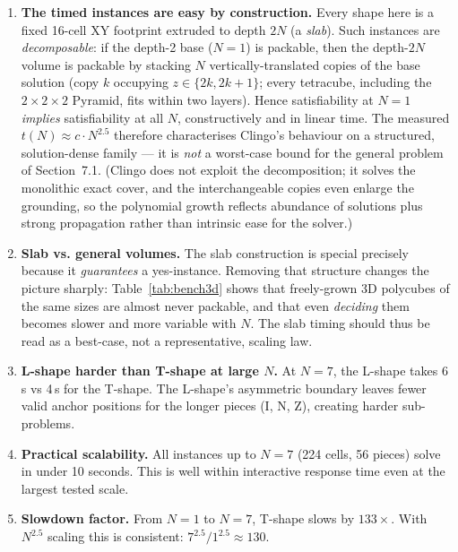 \documentclass[12pt,a4paper]{article}
\begin{document}
\begin{enumerate}[leftmargin=1.8em]
  \item \textbf{The timed instances are easy by construction.}  Every shape
        here is a fixed 16-cell XY footprint extruded to depth $2N$ (a
        \emph{slab}).  Such instances are \emph{decomposable}: if the depth-2
        base ($N=1$) is packable, then the depth-$2N$ volume is packable by
        stacking $N$ vertically-translated copies of the base solution
        (copy $k$ occupying $z \in \{2k, 2k+1\}$; every tetracube, including
        the $2\times2\times2$ Pyramid, fits within two layers).  Hence
        satisfiability at $N=1$ \emph{implies} satisfiability at all $N$,
        constructively and in linear time.  The measured
        $t(N) \approx c \cdot N^{2.5}$ therefore characterises Clingo's
        behaviour on a structured, solution-dense family --- it is \emph{not}
        a worst-case bound for the general problem of Section~7.1.  (Clingo
        does not exploit the decomposition; it solves the monolithic exact
        cover, and the interchangeable copies even enlarge the grounding, so
        the polynomial growth reflects abundance of solutions plus strong
        propagation rather than intrinsic ease for the solver.)

  \item \textbf{Slab vs. general volumes.}  The slab construction is special
        precisely because it \emph{guarantees} a yes-instance.  Removing that
        structure changes the picture sharply: Table~\ref{tab:bench3d} shows
        that freely-grown 3D polycubes of the same sizes are almost never
        packable, and that even \emph{deciding} them becomes slower and more
        variable with $N$.  The slab timing should thus be read as a
        best-case, not a representative, scaling law.

  \item \textbf{L-shape harder than T-shape at large $N$.}  At $N=7$, the
        L-shape takes 6\,s vs 4\,s for the T-shape.  The L-shape's
        asymmetric boundary leaves fewer valid anchor positions for the
        longer pieces (I, N, Z), creating harder sub-problems.

  \item \textbf{Practical scalability.}  All instances up to $N=7$
        (224 cells, 56 pieces) solve in under 10 seconds.  This is
        well within interactive response time even at the largest tested scale.

  \item \textbf{Slowdown factor.}  From $N=1$ to $N=7$, T-shape slows by
        $133\times$.  With $N^{2.5}$ scaling this is consistent:
        $7^{2.5} / 1^{2.5} \approx 130$.
\end{enumerate}
\end{document}
